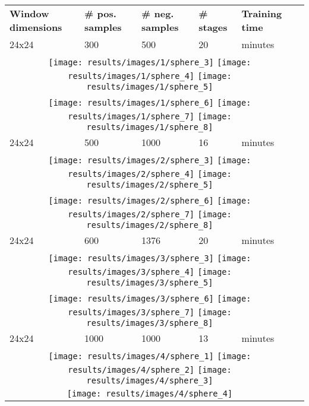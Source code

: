 \begin{tabularx}{\textwidth}{llllll}
    \label{table:results}
    \textbf{Window dimensions} & \textbf{\# pos. samples} & \textbf{\# neg. samples} & \textbf{\# stages} & \textbf{Training time} \\
    24x24 & 300 & 500 & 20 & \mytilda7 minutes \\
    \multicolumn{5}{c}{
        \texttt{[image: results/images/1/sphere\_3]}
        \texttt{[image: results/images/1/sphere\_4]}
        \texttt{[image: results/images/1/sphere\_5]}
    } \\
    \multicolumn{5}{c}{
        \texttt{[image: results/images/1/sphere\_6]}
        \texttt{[image: results/images/1/sphere\_7]}
        \texttt{[image: results/images/1/sphere\_8]}
    } \\
    24x24 & 500 & 1000 & 16 & \mytilda2 minutes \\
    \multicolumn{5}{c}{
        \texttt{[image: results/images/2/sphere\_3]}
        \texttt{[image: results/images/2/sphere\_4]}
        \texttt{[image: results/images/2/sphere\_5]}
    } \\
    \multicolumn{5}{c}{
        \texttt{[image: results/images/2/sphere\_6]}
        \texttt{[image: results/images/2/sphere\_7]}
        \texttt{[image: results/images/2/sphere\_8]}
    } \\
    24x24 & 600 & 1376 & 20 & \mytilda17 minutes \\
    \multicolumn{5}{c}{
        \texttt{[image: results/images/3/sphere\_3]}
        \texttt{[image: results/images/3/sphere\_4]}
        \texttt{[image: results/images/3/sphere\_5]}
    } \\
    \multicolumn{5}{c}{
        \texttt{[image: results/images/3/sphere\_6]}
        \texttt{[image: results/images/3/sphere\_7]}
        \texttt{[image: results/images/3/sphere\_8]}
    } \\
    24x24 & 1000 & 1000 & 13 & \mytilda90 minutes \\
    \multicolumn{5}{c}{
        \texttt{[image: results/images/4/sphere\_1]}
        \texttt{[image: results/images/4/sphere\_2]}
        \texttt{[image: results/images/4/sphere\_3]}
    } \\
    \multicolumn{5}{c}{
        \texttt{[image: results/images/4/sphere\_4]}
    }
\end{tabularx}
